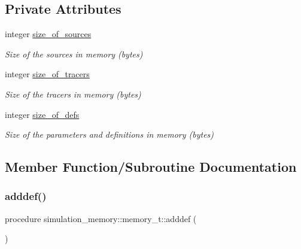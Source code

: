 \subsection*{Private Attributes}
\begin{DoxyCompactItemize}
\item 
integer \hyperlink{structsimulation__memory_1_1memory__t_ad912536f320cd23924d860c4b6810f8a}{size\+\_\+of\+\_\+sources}
\begin{DoxyCompactList}\small\item\em Size of the sources in memory (bytes) \end{DoxyCompactList}\item 
integer \hyperlink{structsimulation__memory_1_1memory__t_aa8a0070dcb1efa0b14a86d40fee9e03d}{size\+\_\+of\+\_\+tracers}
\begin{DoxyCompactList}\small\item\em Size of the tracers in memory (bytes) \end{DoxyCompactList}\item 
integer \hyperlink{structsimulation__memory_1_1memory__t_adba405ad7926a890f3e4feaa9c0cf904}{size\+\_\+of\+\_\+defs}
\begin{DoxyCompactList}\small\item\em Size of the parameters and definitions in memory (bytes) \end{DoxyCompactList}\end{DoxyCompactItemize}


\subsection{Member Function/\+Subroutine Documentation}
\mbox{\label{structsimulation__memory_1_1memory__t_a5a231dfd0c9f39ad6c949519ad168f70}} 
\subsubsection{\texorpdfstring{adddef()}{adddef()}}
{\footnotesize\ttfamily procedure simulation\+\_\+memory\+::memory\+\_\+t\+::adddef (\begin{DoxyParamCaption}{ }\end{DoxyParamCaption})\hspace{0.3cm}{\ttfamily [private]}}

